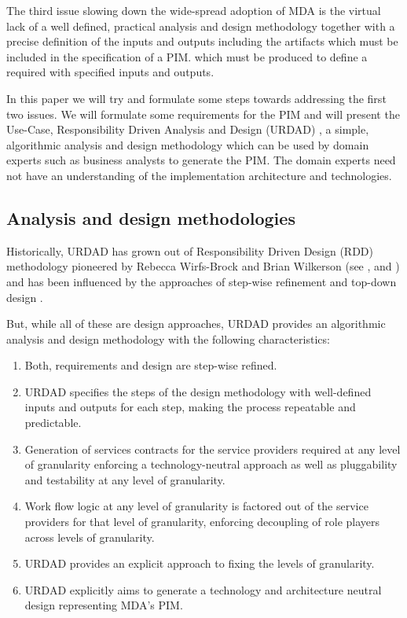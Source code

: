 \documentclass[reviewcopy]{elsart}
\begin{document}
The third issue slowing down the wide-spread adoption of MDA is the virtual lack of
a well defined, practical analysis and design methodology together with a
precise definition of the inputs and outputs
including the artifacts which must be included in the specification of a PIM.
which must be produced to define a required with specified inputs and outputs.

In this paper we will try and formulate some steps towards addressing the first
two issues. We will formulate some requirements for the PIM and will present
the Use-Case, Responsibility Driven Analysis and Design (URDAD)
\cite{solms:urdad}, a simple, algorithmic analysis and design methodology
which can be used by domain experts such as business analysts to generate the
PIM. The domain experts need not have an understanding of the implementation
architecture and technologies.


\subsection{Analysis and design methodologies}

Historically, URDAD has grown out of Responsibility Driven Design (RDD)
methodology pioneered by Rebecca Wirfs-Brock and Brian Wilkerson (see
\cite{wirfs-brock:responsibilityDrivenApproach},  and
\cite{wirfs-brock:objectDesign} \cite{wirfs-brock:designSimplicity}) and has
been influenced by the approaches of step-wise refinement \cite{wirth:stepWiseRefinement}
and top-down design \cite{martin:agileSoftwareDevelopment}.

But, while all of these are design approaches, URDAD provides an algorithmic
analysis and design methodology with the following characteristics:
\begin{enumerate}
  \item Both, requirements and design are step-wise refined.
  \item URDAD specifies the steps of the design methodology with
			well-defined inputs and outputs for each step, making the process repeatable
			and predictable.
  \item Generation of services contracts for the service providers required at any
			level of granularity enforcing a technology-neutral approach as well as
			pluggability and testability at any level of	granularity.
	\item Work flow logic at any level of granularity is factored out of the service
			providers for that level of granularity, enforcing decoupling of role players
			across levels of granularity.
	\item URDAD provides an explicit approach to fixing the levels of granularity.
   \item URDAD explicitly aims to generate a technology and architecture neutral design
			representing MDA's PIM.
\end{enumerate}
\end{document}
